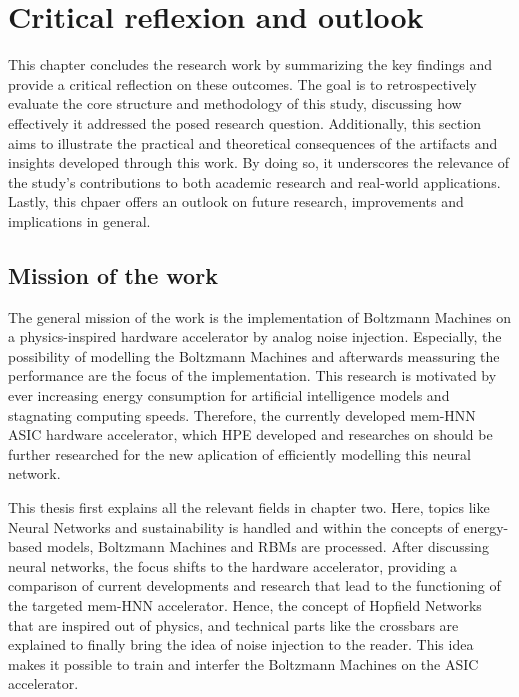 \chapter{Critical reflexion and outlook}
This chapter concludes the research work by summarizing the key findings and provide a critical reflection on these outcomes.
The goal is to retrospectively evaluate the core structure and methodology of this study, discussing how effectively it addressed the posed research question.
Additionally, this section aims to illustrate the practical and theoretical consequences of the artifacts and insights developed through this work.
By doing so, it underscores the relevance of the study’s contributions to both academic research and real-world applications.
Lastly, this chpaer offers an outlook on future research, improvements and implications in general.

\section{Mission of the work}
The general mission of the work is the implementation of Boltzmann Machines on a physics-inspired 
hardware accelerator by analog noise injection. 
Especially, the possibility of modelling the Boltzmann Machines and afterwards meassuring the performance are the focus of the implementation.
This research is motivated by ever increasing energy consumption for artificial intelligence models and stagnating computing speeds.
Therefore, the currently developed \ac{mem-HNN} \ac{ASIC} hardware accelerator, which HPE developed and researches on 
should be further researched for the new aplication of efficiently modelling this neural network.

This thesis first explains all the relevant fields in chapter two.
Here, topics like Neural Networks and sustainability is handled and within the concepts of energy-based models,
Boltzmann Machines and \ac{RBM}s are processed. 
After discussing neural networks, the focus shifts to the hardware accelerator, providing a comparison of current developments and research that lead to the functioning of the targeted \ac{mem-HNN} accelerator.
Hence, the concept of Hopfield Networks that are inspired out of physics, and technical parts like the crossbars are explained to 
finally bring the idea of noise injection to the reader. 
This idea makes it possible to train and interfer the Boltzmann Machines on the \ac{ASIC} accelerator.

